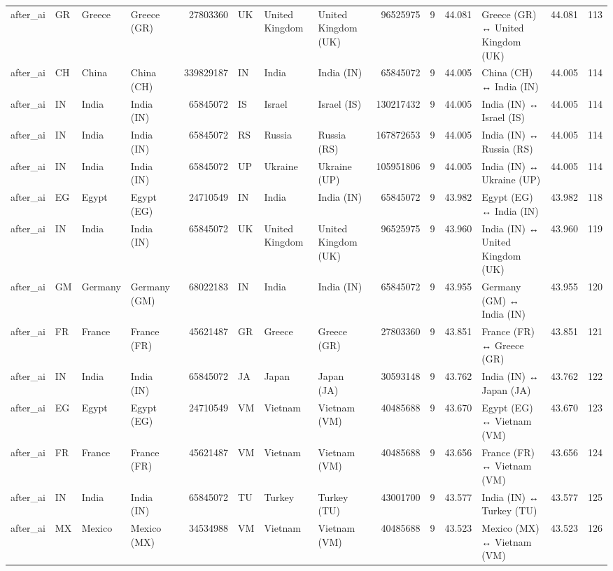 \begin{tabular}{llllrlllrrrlrr}
after\_ai & GR & Greece & Greece (GR) & 27803360 & UK & United Kingdom & United Kingdom (UK) & 96525975 & 9 & 44.081 & Greece (GR) ↔ United Kingdom (UK) & 44.081 & 113 \\
after\_ai & CH & China & China (CH) & 339829187 & IN & India & India (IN) & 65845072 & 9 & 44.005 & China (CH) ↔ India (IN) & 44.005 & 114 \\
after\_ai & IN & India & India (IN) & 65845072 & IS & Israel & Israel (IS) & 130217432 & 9 & 44.005 & India (IN) ↔ Israel (IS) & 44.005 & 114 \\
after\_ai & IN & India & India (IN) & 65845072 & RS & Russia & Russia (RS) & 167872653 & 9 & 44.005 & India (IN) ↔ Russia (RS) & 44.005 & 114 \\
after\_ai & IN & India & India (IN) & 65845072 & UP & Ukraine & Ukraine (UP) & 105951806 & 9 & 44.005 & India (IN) ↔ Ukraine (UP) & 44.005 & 114 \\
after\_ai & EG & Egypt & Egypt (EG) & 24710549 & IN & India & India (IN) & 65845072 & 9 & 43.982 & Egypt (EG) ↔ India (IN) & 43.982 & 118 \\
after\_ai & IN & India & India (IN) & 65845072 & UK & United Kingdom & United Kingdom (UK) & 96525975 & 9 & 43.960 & India (IN) ↔ United Kingdom (UK) & 43.960 & 119 \\
after\_ai & GM & Germany & Germany (GM) & 68022183 & IN & India & India (IN) & 65845072 & 9 & 43.955 & Germany (GM) ↔ India (IN) & 43.955 & 120 \\
after\_ai & FR & France & France (FR) & 45621487 & GR & Greece & Greece (GR) & 27803360 & 9 & 43.851 & France (FR) ↔ Greece (GR) & 43.851 & 121 \\
after\_ai & IN & India & India (IN) & 65845072 & JA & Japan & Japan (JA) & 30593148 & 9 & 43.762 & India (IN) ↔ Japan (JA) & 43.762 & 122 \\
after\_ai & EG & Egypt & Egypt (EG) & 24710549 & VM & Vietnam & Vietnam (VM) & 40485688 & 9 & 43.670 & Egypt (EG) ↔ Vietnam (VM) & 43.670 & 123 \\
after\_ai & FR & France & France (FR) & 45621487 & VM & Vietnam & Vietnam (VM) & 40485688 & 9 & 43.656 & France (FR) ↔ Vietnam (VM) & 43.656 & 124 \\
after\_ai & IN & India & India (IN) & 65845072 & TU & Turkey & Turkey (TU) & 43001700 & 9 & 43.577 & India (IN) ↔ Turkey (TU) & 43.577 & 125 \\
after\_ai & MX & Mexico & Mexico (MX) & 34534988 & VM & Vietnam & Vietnam (VM) & 40485688 & 9 & 43.523 & Mexico (MX) ↔ Vietnam (VM) & 43.523 & 126 \\

\end{tabular}

